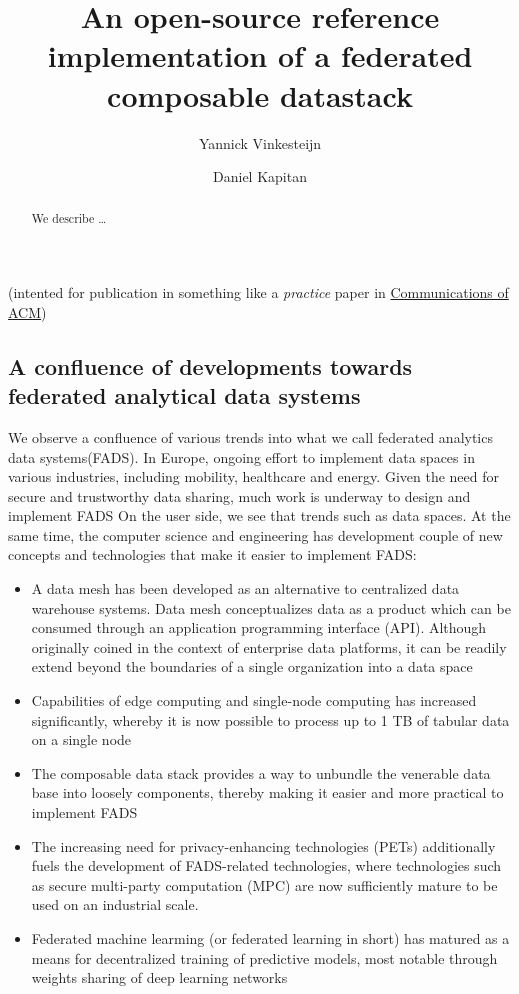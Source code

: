 \documentclass[
  letterpaper,
  DIV=11,
  numbers=noendperiod]{scrartcl}
\title{An open-source reference implementation of a federated composable
datastack}
\author{Yannick Vinkesteijn \and Daniel Kapitan}
\date{}
\providecommand{\tightlist}{%
  \setlength{\itemsep}{0pt}\setlength{\parskip}{0pt}}\usepackage{longtable,booktabs,array}
\begin{document}
\maketitle
\begin{abstract}
We describe \ldots{}
\end{abstract}


(intented for publication in something like a \emph{practice} paper in
\href{https://cacm.acm.org/author-guidelines/\#CACMsubmission}{Communications
of ACM})

\subsection{A confluence of developments towards federated analytical
data
systems}\label{a-confluence-of-developments-towards-federated-analytical-data-systems}

We observe a confluence of various trends into what we call federated
analytics data systems(FADS). In Europe, ongoing effort to implement
data spaces in various industries, including mobility, healthcare and
energy. Given the need for secure and trustworthy data sharing, much
work is underway to design and implement FADS On the user side, we see
that trends such as data spaces. At the same time, the computer science
and engineering has development couple of new concepts and technologies
that make it easier to implement FADS:

\begin{itemize}
\tightlist
\item
  A data mesh has been developed as an alternative to centralized data
  warehouse systems. Data mesh conceptualizes data as a product which
  can be consumed through an application programming interface (API).
  Although originally coined in the context of enterprise data
  platforms, it can be readily extend beyond the boundaries of a single
  organization into a data space
\item
  Capabilities of edge computing and single-node computing has increased
  significantly, whereby it is now possible to process up to 1 TB of
  tabular data on a single node
\item
  The composable data stack provides a way to unbundle the venerable
  data base into loosely components, thereby making it easier and more
  practical to implement FADS
\item
  The increasing need for privacy-enhancing technologies (PETs)
  additionally fuels the development of FADS-related technologies, where
  technologies such as secure multi-party computation (MPC) are now
  sufficiently mature to be used on an industrial scale.
\item
  Federated machine learming (or federated learning in short) has
  matured as a means for decentralized training of predictive models,
  most notable through weights sharing of deep learning networks
\end{itemize}
\end{document}
